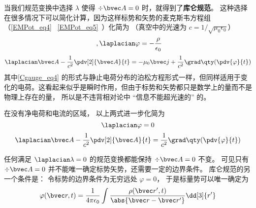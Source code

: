 
\begin{issues}
\issueDraft
\end{issues}


当我们规范变换中选择 $\lambda$ 使得 $\div \bvec A = 0$ 时，就得到了\textbf{库仑规范}。 这种选择在很多情况下可以简化计算，因为这样标势和矢势的麦克斯韦方程组（\autoref{EMPot_eq4}~ \autoref{EMPot_eq5}~）化简为 （真空中的光速为 $c = 1/\sqrt{\mu_0\epsilon_0}$）%
\begin{equation}\label{Cgauge_eq4}~,
\laplacian \varphi = -\frac{\rho}{\epsilon_0}
\end{equation}
\begin{equation}\label{Cgauge_eq3}
\laplacian \bvec A - \frac{1}{c^2} \pdv[2]{\bvec A}{t} = -\mu_0\bvec j + \frac{1}{c^2} \grad\qty(\pdv{\varphi}{t})
\end{equation}
其中\autoref{Cgauge_eq4} 的形式与静止电荷分布的泊松方程形式一样，但同样适用于变化的电荷。这看起来似乎是瞬时作用，但由于标势和矢势都只是数学上的量而不是物理上存在的量， 所以是不违背相对论中 “信息不能超光速的” 的。

在没有净电荷和电流的区域， 以上两式进一步化简为
\begin{equation}
\laplacian \varphi = 0
\end{equation}
\begin{equation}
\laplacian \bvec A - \frac{1}{c^2}\pdv[2]{\bvec A}{t} = \frac{1}{c^2} \grad\qty(\pdv{\varphi}{t})
\end{equation}

任何满足 $\laplacian \lambda = 0$ 的规范变换都能保持 $\div \bvec A = 0$ 不变。 可见只有 $\div \bvec A = 0$ 并不能唯一确定标势矢势，还需要一定的边界条件。 库仑规范的另一个条件是： 令标势的边界条件为无穷远处 $\varphi = 0$， 于是标量势可以唯一确定为
\begin{equation}\label{Cgauge_eq1}
\varphi(\bvec r, t) = \frac{1}{4\pi\epsilon_0} \int \frac{\rho(\bvec r', t)}{\abs{\bvec r - \bvec r'}} \dd[3]{r'}
\end{equation}

